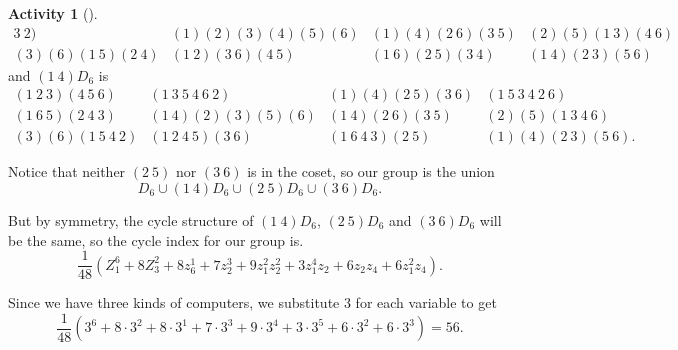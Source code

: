 \documentclass[10pt,]{book}
\theoremstyle{plain}
\theoremstyle{definition}
\newtheorem{activity}[project]{Activity}
\numberwithin{equation}{chapter}
\newcommand{\amp}{&}
\begin{document}
\begin{activity}[]
\begin{equation*}
\begin{array}{cccc}
3\ 2)\amp (1)(2)(3)(4)(5)(6)\amp (1)(4)(2\ 6)(3\ 5)\amp (2)(5)(1\ 3)(4\ 6)\\
(3)(6)(1\ 5)(2\ 4)\amp (1\ 2)(3\ 6)(4\ 5)\amp (1\ 6)(2\ 5)(3\ 4)\amp (1\ 4)(2\ 3)(5\ 6)
\end{array}
\end{equation*}
and \((1\ 4)D_6\) is%
\begin{equation*}
\begin{array}{cccc}
(1\ 2\ 3) (4\ 5\ 6)\amp (1\ 3\ 5\ 4\ 6\ 2)\amp (1) (4)(2\ 5)(3 \ 6)\amp  (1\ 5\ 3\ 4\ 2\ 6)\\(1\ 6\
5)(2\ 4\ 3)\amp (1\ 4)(2)(3)(5)(6)\amp (1\ 4)(2\ 6)(3\ 5)\amp (2)(5)(1\ 3\ 4\ 6)\\
(3)(6)(1\ 5\ 4\ 2)\amp (1\ 2\ 4\ 5)(3\ 6)\amp (1\ 6\ 4\ 3)(2\ 5)\amp (1)(4)(2\ 3)(5\ 6).
\end{array}
\end{equation*}
%
\par
Notice that neither \((2\ 5)\) nor \((3\ 6)\) is in the coset, so our group is the union%
\begin{equation*}
D_6\cup (1\ 4)D_6 \cup(2\ 5)D_6 \cup (3\ 6)D_6.
\end{equation*}
%
\par
But by symmetry, the cycle structure of \((1\ 4)D_6\), \((2\ 5)D_6\) and \((3\ 6)D_6\) will be the same, so the cycle index for our group is.%
\begin{equation*}
\frac{1}{48} \left(Z^6_1 + 8Z^2_3
+8z_6^1 +7z_2^3+9z_1^2z_2^2 +3z_1^4z_2+
6z_2z_4+6z_1^2z_4\right).
\end{equation*}
%
\par
Since we have three kinds of computers, we substitute 3 for each variable to get%
\begin{equation*}
\frac{1}{48} \left(3^6 + 8\cdot3^2
+8\cdot3^1 +7\cdot3^3+9\cdot3^4 +3\cdot3^5+
6\cdot3^2+6\cdot3^3\right)=56.
\end{equation*}
%
\end{activity}
\end{document}
